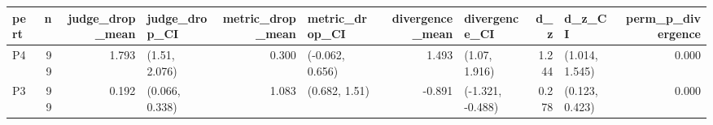 \begin{tabular}{lrrlrlrlrlr}
\toprule
pert & n & judge_drop_mean & judge_drop_CI & metric_drop_mean & metric_drop_CI & divergence_mean & divergence_CI & d_z & d_z_CI & perm_p_divergence \\
\midrule
P4 & 99 & 1.793 & (1.51, 2.076) & 0.300 & (-0.062, 0.656) & 1.493 & (1.07, 1.916) & 1.244 & (1.014, 1.545) & 0.000 \\
P3 & 99 & 0.192 & (0.066, 0.338) & 1.083 & (0.682, 1.51) & -0.891 & (-1.321, -0.488) & 0.278 & (0.123, 0.423) & 0.000 \\
\bottomrule
\end{tabular}
